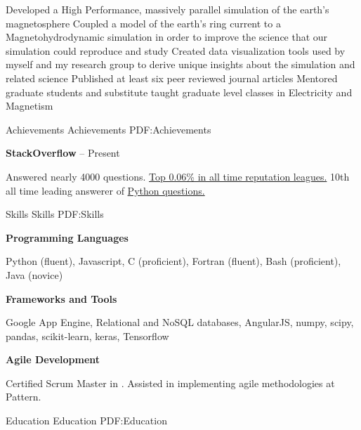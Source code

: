 \documentclass[letterpaper,MMMyyyy,nonstopmode]{simpleresumecv}
\begin{document}
\begin{Body}
\Gap
\begin{Detail}
\BulletItem
Developed a High Performance, massively parallel simulation of the earth's magnetosphere
\BulletItem
Coupled a model of the earth's ring current to a Magnetohydrodynamic simulation in order to improve the science that our simulation could reproduce and study
\BulletItem
Created data visualization tools used by myself and my research group to derive unique insights about the simulation and related science
\BulletItem
Published at least six peer reviewed journal articles
\BulletItem
Mentored graduate students and substitute taught graduate level classes in Electricity and Magnetism
\end{Detail}



\Section
{Achievements}
{Achievements}
{PDF:Achievements}

\Entry
\textbf{StackOverflow}
\hfill
{} -- Present
\begin{Detail}
\Item
Answered nearly 4000 questions.
\Item
\href{http://stackoverflow.com/cv/matthew-gilson-428809}{Top 0.06\% in all time reputation leagues.}
\Item
10th all time leading answerer of \href{http://stackoverflow.com/tags/python/topusers}{Python questions.}
\end{Detail}



\Section
{Skills}
{Skills}
{PDF:Skills}

\Entry
\textbf{Programming Languages}
\begin{Detail}
\Item Python (fluent), Javascript, C (proficient), Fortran (fluent), Bash (proficient), Java (novice)
\end{Detail}

\BigGap
\Entry
\textbf{Frameworks and Tools}
\begin{Detail}
\Item Google App Engine, Relational and NoSQL databases, AngularJS, numpy, scipy, pandas, scikit-learn, keras, Tensorflow
\end{Detail}

\BigGap
\Entry
\textbf{Agile Development}
\begin{Detail}
\Item Certified Scrum Master in .  Assisted in implementing agile methodologies at Pattern.
\end{Detail}



\Section
{Education}
{Education}
{PDF:Education}


\end{Body}
\end{document}
